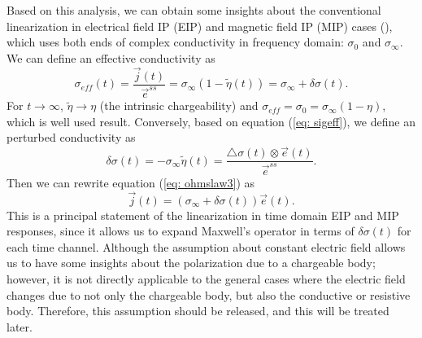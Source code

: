 \documentclass[a4paper, 11pt]{article}
\newcommand{\siginf}{\sigma_\infty}
\newcommand{\dsig}{\triangle\sigma}
\renewcommand {\j}  { {\vec j} }
\newcommand {\e}  { {\vec e} }
\newcommand{\peta}{\tilde{\eta}}
\newcommand{\sigpert}{\delta\sigma}
\begin{document}
Based on this analysis, we can obtain some insights about the conventional linearization in electrical field IP (EIP) and magnetic field IP (MIP) cases (\cite{seigel1959,seigel1974}), which uses both ends of complex conductivity in frequency domain: $\sigma_0$ and $\siginf$. We can define an effective conductivity as
\begin{equation}
	\sigma_{eff}(t) = \frac{\j(t)}{\e^{ss}} = \siginf(1-\peta(t)) = \siginf + \delta\sigma(t).
  \label{eq: sigeff}
\end{equation}
For $t \rightarrow \infty$, $\peta\rightarrow \eta$ (the intrinsic chargeability) and $\sigma_{eff} = \sigma_0 = \siginf(1-\eta)$, which is well used result.
Conversely, based on equation (\ref{eq: sigeff}), we define an perturbed conductivity as
\begin{equation}
  \delta\sigma(t) = -\siginf\peta(t) =\frac{\dsig(t)\otimes \e(t)}{\e^{ss}}.
  \label{eq: sigpert}
\end{equation}
Then we can rewrite equation (\ref{eq: ohmslaw3}) as
\begin{equation}
  \j(t) = (\siginf + \delta\sigma(t))\e(t).
\end{equation}
This is a principal statement of the linearization in time domain EIP and MIP responses, since it allows us to expand Maxwell's operator in terms of $\sigpert(t)$ for each time channel. Although the assumption about constant electric field allows us to have some insights about the polarization due to a chargeable body; however, it is not directly applicable to the general cases where the electric field changes due to not only the chargeable body, but also the conductive or resistive body. Therefore, this assumption should be released, and this will be treated later.
\end{document}
